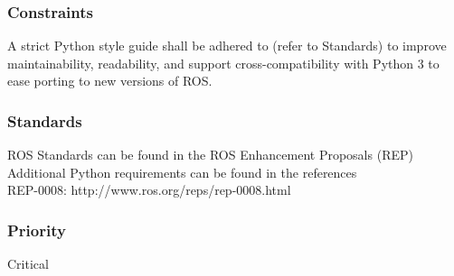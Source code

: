 \subsubsection{Constraints}
A strict Python style guide shall be adhered to (refer to Standards) to improve maintainability, readability, and support cross-compatibility with Python 3 to ease porting to new versions of ROS.
\subsubsection{Standards}
ROS Standards can be found in the ROS Enhancement Proposals (REP) \\
Additional Python requirements can be found in the references \\
REP-0008: http://www.ros.org/reps/rep-0008.html

\subsubsection{Priority}
Critical
